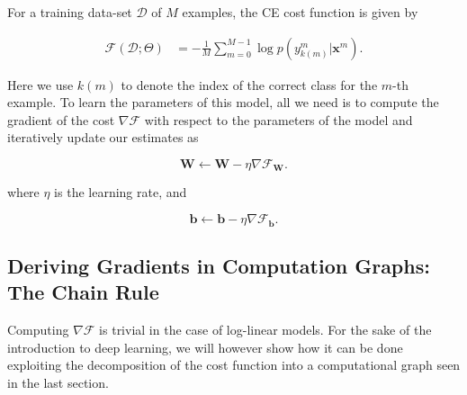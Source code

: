 For a training data-set $\mathcal{D}$ of $M$ examples, the CE cost function is given by

\begin{align}
\mathcal{F}(\mathcal{D};\Theta) & = -\frac{1}{M}\sum_{m=0}^{M-1} \log p(y^m_{k(m)} | \mathbf{x}^m).
\label{eq:CostLogPos}
\end{align}

\indent Here we use $k(m)$ to denote the index of the correct class for the $m$-th
example. To learn the parameters of this model, all we need is to compute the gradient
of the cost $\nabla\mathcal{F}$ with respect to the parameters of the model and
iteratively update our estimates as 

\begin{equation}
\mathbf{W} \leftarrow \mathbf{W} - \eta \nabla\mathcal{F}_\mathbf{W}. 
\end{equation}

\noindent where $\eta$ is the learning rate, and

\begin{equation}
\mathbf{b} \leftarrow \mathbf{b} - \eta \nabla\mathcal{F}_\mathbf{b}. 
\end{equation}


\subsection{Deriving Gradients in Computation Graphs: The Chain Rule}

Computing $\nabla\mathcal{F}$ is trivial in the case of log-linear models. For
the sake of the introduction to deep learning, we will however show how it can
be done exploiting the decomposition of the cost function into a computational
graph seen in the last section.  

